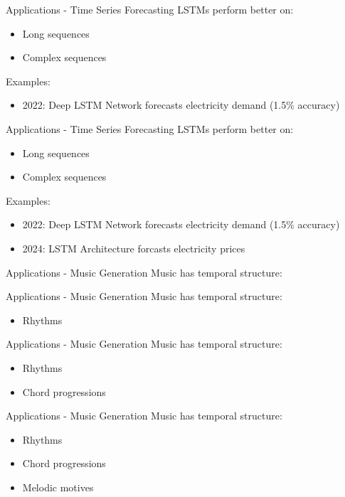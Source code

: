 \documentclass[10pt, aspectratio=169]{beamer}
\begin{document}
\begin{frame}[t]{Applications - Time Series Forecasting}
LSTMs perform better on:
\begin{itemize}
    \item Long sequences
    \item Complex sequences
\end{itemize}
Examples:
\begin{itemize}
    \item 2022: Deep LSTM Network forecasts electricity demand (1.5\% accuracy)
\end{itemize}
\end{frame}

\begin{frame}[t]{Applications - Time Series Forecasting}
LSTMs perform better on:
\begin{itemize}
    \item Long sequences
    \item Complex sequences
\end{itemize}
Examples:
\begin{itemize}
    \item 2022: Deep LSTM Network forecasts electricity demand (1.5\% accuracy)
    \item 2024: LSTM Architecture forcasts electricity prices 
\end{itemize}
\end{frame}

\begin{frame}[t]{Applications - Music Generation}
Music has temporal structure:
\end{frame}

\begin{frame}[t]{Applications - Music Generation}
Music has temporal structure:
\begin{itemize}
    \item Rhythms
\end{itemize}
\end{frame}

\begin{frame}[t]{Applications - Music Generation}
Music has temporal structure:
\begin{itemize}
    \item Rhythms
    \item Chord progressions
\end{itemize}
\end{frame}

\begin{frame}[t]{Applications - Music Generation}
Music has temporal structure:
\begin{itemize}
    \item Rhythms
    \item Chord progressions
    \item Melodic motives
\end{itemize}
\end{frame}
\end{document}
